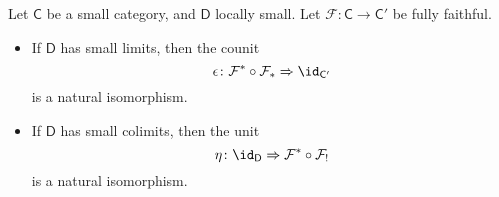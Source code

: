 \documentclass[main.tex]{subfiles}
\begin{document}
\begin{theorem}
  \label{thm:kan_extension_along_fully_faithful_functor_counit_isomorphism}
  Let $\mathsf{C}$ be a small category, and $\mathsf{D}$ locally small. Let $\mathcal{F}\colon \mathsf{C} \to \mathsf{C'}$ be fully faithful.
  \begin{itemize}
    \item If $\mathsf{D}$ has small limits, then the counit
      \begin{equation*}
        \epsilon\colon \mathcal{F}^{*} \circ \mathcal{F}_{*} \Rightarrow \id_{\mathsf{C}'}
      \end{equation*}
      is a natural isomorphism.

    \item If $\mathsf{D}$ has small colimits, then the unit
      \begin{equation*}
        \eta\colon \id_{\mathsf{D}} \Rightarrow \mathcal{F}^{*} \circ \mathcal{F}_{!}
      \end{equation*}
      is a natural isomorphism.
  \end{itemize}
\end{theorem}
\end{document}
